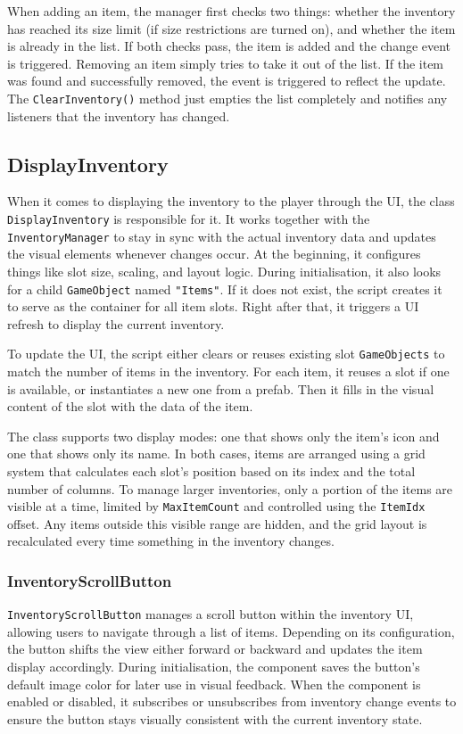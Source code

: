 When adding an item, the manager first checks two things: whether the inventory has reached its size limit (if size restrictions are turned on), and whether the item is already in the list. If both checks pass, the item is added and the change event is triggered. Removing an item simply tries to take it out of the list. If the item was found and successfully removed, the event is triggered to reflect the update. The \verb|ClearInventory()| method just empties the list completely and notifies any listeners that the inventory has changed.

\subsection{DisplayInventory}
\label{DisplayInventory}
When it comes to displaying the inventory to the player through the UI, the class \verb|DisplayInventory| is responsible for it. It works together with the \verb|InventoryManager| to stay in sync with the actual inventory data and updates the visual elements whenever changes occur. At the beginning, it configures things like slot size, scaling, and layout logic. During initialisation, it also looks for a child \verb|GameObject| named \verb|"Items"|. If it does not exist, the script creates it to serve as the container for all item slots. Right after that, it triggers a UI refresh to display the current inventory.

To update the UI, the script either clears or reuses existing slot \verb|GameObjects| to match the number of items in the inventory. For each item, it reuses a slot if one is available, or instantiates a new one from a prefab. Then it fills in the visual content of the slot with the data of the item.

The class supports two display modes: one that shows only the item's icon and one that shows only its name. In both cases, items are arranged using a grid system that calculates each slot’s position based on its index and the total number of columns. To manage larger inventories, only a portion of the items are visible at a time, limited by \verb|MaxItemCount| and controlled using the \verb|ItemIdx| offset. Any items outside this visible range are hidden, and the grid layout is recalculated every time something in the inventory changes.
 
\subsubsection{InventoryScrollButton}
\verb|InventoryScrollButton| manages a scroll button within the inventory UI, allowing users to navigate through a list of items. Depending on its configuration, the button shifts the view either forward or backward and updates the item display accordingly. During initialisation, the component saves the button's default image color for later use in visual feedback. When the component is enabled or disabled, it subscribes or unsubscribes from inventory change events to ensure the button stays visually consistent with the current inventory state.

